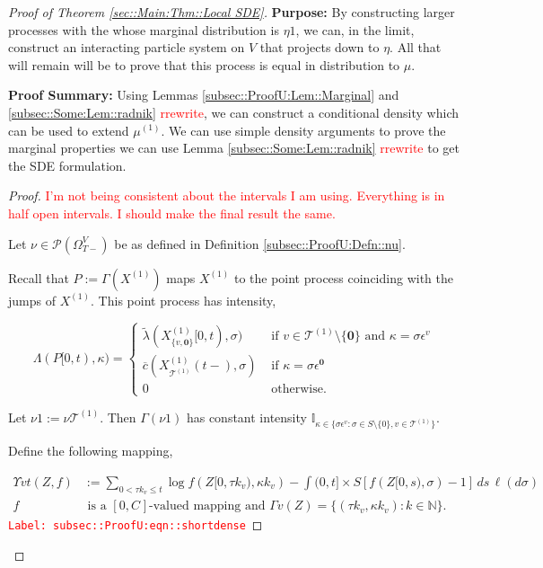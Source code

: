 \documentclass[12pt]{article}
\newcommand{\mb}{\mathbb}
\newcommand{\mc}{\mathcal}
\newcommand{\ov}{\overline}
\newcommand{\te}{\text}
\newcommand{\ep}{\epsilon}
\newcommand{\tr}{\textcolor{red}}
\newcommand{\labe}[1]{\tr{\texttt{Label: #1}}}
\newcommand{\purpose}{\textbf{Purpose: }}
\newcommand{\pfsum}{\textbf{Proof Summary: }}
\newcommand{\ind}{\hspace{24pt}}
\newcommand{\defeq}{:=}								%
\newcommand{\pmsr}{\mc{P}}							%
\renewcommand{\root}{\mathbf{0}}				%
\renewcommand{\v}{v}							%
\renewcommand{\S}{S}							%
\newcommand{\s}{\sigma}							%
\newcommand{\ev}{\ep}							%
\newcommand{\T}{T}								%
\renewcommand{\t}{t}							%
\newcommand{\sset}{\Omega}						%
\renewcommand{\tt}{s}							%
\newcommand{\X}{X}								%
\newcommand{\vind}[1]{^{#1}}					%
\newcommand{\vsi}[1]{^{#1}}						%
\newcommand{\cind}[1]{_{#1}}					%
\newcommand{\tp}[1]{(#1)}						%
\newcommand{\tip}[1]{#1}						%
\newcommand{\ts}[1]{_{#1}}						%
\newcommand{\const}{C}							%
\newcommand{\IGrg}{\ov{c}}						%
\newcommand{\tree}{\mc{T}}						%
\newcommand{\sln}[1]{^{(#1)}}						%
\newcommand{\Sm}{\ell}							%
\newcommand{\alt}[1]{\widetilde{#1}}			%
\newcommand{\indx}[1]{_{#1}}					%
\newcommand{\m}{\mu}							%
\newcommand{\mm}{\nu}							%
\newcommand{\mmm}{\eta}							%
\newcommand{\XXX}{Z}							%
\newcommand{\rt}{\tau}							%
\renewcommand{\it}{k}							%
\newcommand{\pmap}{\Gamma}						%
\renewcommand{\mark}{\kappa}					%
\newcommand{\rp}{P}								%
\newcommand{\ratee}{\Lambda}					%
\newcommand{\crate}{\alt{\lambda}}				%
\newcommand{\ds}{\Upsilon}						%
\begin{document}
\begin{proof}[Proof of Theorem \ref{sec::Main:Thm::Local SDE}]
\purpose By constructing larger processes with the whose marginal distribution is \(\mmm{}{}{1}\), we can, in the limit, construct an interacting particle system on \(V\) that projects down to \(\mmm{}{}{}\). All that will remain will be to prove that this process is equal in distribution to \(\m{}{}{}\).

\pfsum Using Lemmas \ref{subsec::ProofU:Lem::Marginal} and \ref{subsec::Some:Lem::radnik} \tr{rrewrite}, we can construct a conditional density which can be used to extend \(\mu\sln{1}\). We can use simple density arguments to prove the marginal properties we can use Lemma \ref{subsec::Some:Lem::radnik} \tr{rrewrite} to get the SDE formulation.

\begin{proof}
\tr{I'm not being consistent about the intervals I am using. Everything is in half open intervals. I should make the final result the same.}

Let \(\mm{}{}{} \in \pmsr(\sset\vsi{V}\ts{\T-})\) be as defined in Definition \ref{subsec::ProofU:Defn::nu}.

\ind Recall that \(\rp{} \defeq \pmap{}(\X\sln{1}\cind{}\tip{})\) maps \(\X\sln{1}\cind{}\tip{}\) to the point process coinciding with the jumps of \(\X\sln{1}\cind{}\tip{}\). This point process has intensity,

\[\ratee{}(\rp{}[0,\t),\mark{}) = \begin{cases}
\crate{}{}(\X\sln{1}\cind{\{\v,\root\}}\tip{[0,\t)},\s) &\te{ if } \v\in \tree\sln{1}\setminus\{\root\}\te{ and } \mark{} = \s\ev\vind{\v}\\
\IGrg{}(\X\sln{1}\cind{\tree\sln{1}}\tp{\t-},\s) &\te{ if } \mark{} = \s\ev\vind{\root}\\
0 &\te{ otherwise}.
\end{cases}\]

Let \(\mm{}{}{1} \defeq \mm{\tree\sln{1}}{}{}\). Then \(\pmap{}(\mm{}{}{1})\) has constant intensity \(\mb{I}_{\kappa \in\{\s\ev\vind{\v}:\s\in\S\setminus\{0\},\v\in\tree\sln{1}\}}\). 

\ind Define the following mapping,

\begin{align}
\ds{\v}{\t}(\XXX{}{},f) &\defeq \sum_{0 < \rt{\it}_\v \leq \t} \log{f(\XXX{}{[0,\rt{\it}_\v)},\mark{\it}_\v)} - \int{(0,\t]\times \S} [f(\XXX{}{[0,\tt)},\s) - 1]\,ds\,\Sm(d\s) \label{subsec::ProofU:eqn::shortdense}\\
f&\te{ is a }[0,\const\indx{}] \te{-valued mapping and } \pmap{\v}(\XXX{}{}) = \{(\rt{\it}_\v,\mark{\it}_\v):\it\in\mb{N}\}.\nonumber
\end{align} 
\labe{subsec::ProofU:eqn::shortdense}


\end{proof}
\end{proof}
\end{document}
